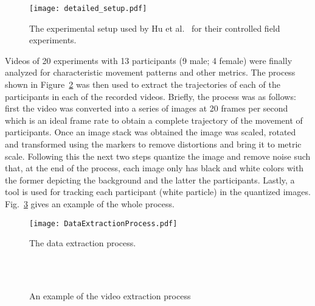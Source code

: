 \begin{figure}[!tbhp]
    \begin{center}
        \texttt{[image: detailed\_setup.pdf]}
    \end{center}
    \caption{The experimental setup used by Hu et al.~\cite{hunanThesis} for their controlled field experiments.}
    \label{fig:detailed_setup}
\end{figure}

Videos of 20 experiments with 13 participants (9 male; 4 female) were finally analyzed for characteristic movement patterns and other metrics. The process shown in Figure~\ref{fig:the_video_extraction_process} was then used to extract the trajectories of each of the participants in each of the recorded videos. Briefly, the process was as follows: first the video was converted into a series of images at 20 frames per second which is an ideal frame rate to obtain a complete trajectory of the movement of participants. Once an image stack was obtained the image was scaled, rotated and transformed using the markers to remove distortions and bring it to metric scale. Following this the next two steps quantize the image and remove noise such that, at the end of the process, each image only has black and white colors with the former depicting the background and the latter the participants. Lastly, a tool is used for tracking each participant (white particle) in the quantized images. Fig.~\ref{fig:VideoExtractionExample} gives an example of the whole process.

\begin{figure}[!tbhp]
    \begin{center}
        \texttt{[image: DataExtractionProcess.pdf]}
    \end{center}
    \caption{The data extraction process.}
    \label{fig:the_video_extraction_process}
\end{figure}

\begin{figure}[!tbhp]
    \centering
  		\hspace{1pt}
  		\\
  		\hspace{1pt}
  		\\
  		\hspace{1pt}
  	\caption{An example of the video extraction process}
    \label{fig:VideoExtractionExample}
\end{figure}



